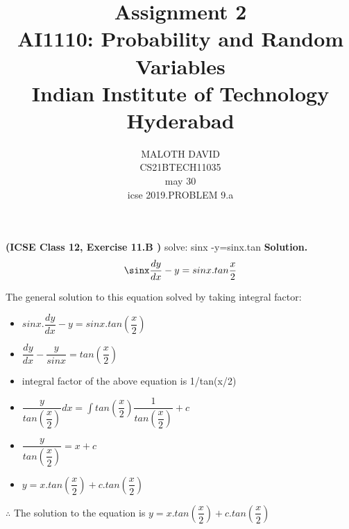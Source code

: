\documentclass[journal,12pt,twocolumn]{IEEEtran}
\title{Assignment 2 \\ \Large AI1110: Probability and Random Variables \\ \large Indian Institute of Technology Hyderabad}
\author{MALOTH DAVID \\ \normalsize CS21BTECH11035\\ \vspace*{20pt} \normalsize  may 30 \\ \vspace*{20pt} \Large icse 2019.PROBLEM 9.a}
\begin{document}
	\maketitle
	
	\textbf{(ICSE Class 12, Exercise 11.B )} solve: sinx -y=sinx.tan
	\textbf{Solution.}		
	\begin{align}
		\sinx \dfrac{dy}{dx}-y=sinx.tan\dfrac{x}{2}
	\end{align}
	
	The general solution to this equation solved by taking integral factor:
	
\begin{itemize}
\item $sinx.\dfrac {dy}{dx}-y =sinx.tan(\dfrac{x}{2}) $ \\
\item $\dfrac{dy}{dx}-\dfrac{y}{sinx}=tan(\dfrac{x}{2})$ \\
\item integral  factor of the above equation is 1/tan(x/2)\\
\item $\dfrac{y}{tan(\dfrac{x}{2})}dx = $$\int$$ 
tan(\dfrac{x}{2})\dfrac{1}{tan(\dfrac{x}{2})} + c $\\
\item $\dfrac{y}{tan(\dfrac{x}{2})} = x+c $\\
\item$ y = x.tan(\dfrac {x}{2})  + c.tan(\dfrac{x}{2}) $
\end{itemize}
	$\therefore$ The solution to the equation is $y= x.tan(\dfrac {x}{2})  + c.tan(\dfrac{x}{2})$
	
\end{document}
